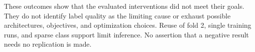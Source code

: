 \documentclass[11pt]{article}
\begin{document}
These outcomes show that the evaluated interventions did not meet their goals.
They do not identify label quality as the limiting cause or exhaust possible
architectures, objectives, and optimization choices. Reuse of fold 2, single
training runs, and sparse class support limit inference. No assertion that a
negative result needs no replication is made.



\end{document}
